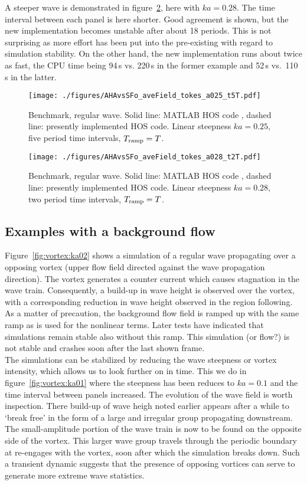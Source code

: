 \documentclass[a4paper,12pt]{article}
\renewcommand{\_}[1]{_\mr{#1}}
\begin{document}
A steeper wave is demonstrated in figure~\ref{fig:stokes_ka028}, here with $ka = 0.28$. The time interval between each panel is here shorter. Good agreement is shown, but the new implementation becomes unstable after about 18 periods. This is not surprising as more effort has been put into the pre-existing with regard to simulation stability. On the other hand, the new implementation runs about twice as fast, the CPU time being 94\,s vs. 220\,s in the former example and 52\,s vs.\ 110\,s in the latter.

\begin{figure}[h!ptb]%
\centering
\texttt{[image: ./figures/AHAvsSFo\_waveField\_Stokes\_ka025\_dt5T.pdf]}%
\caption{Benchmark, regular wave. Solid line: MATLAB HOS code \citep{SFo2018_HOS}, dashed line: presently implemented HOS code.
Linear steepness $ka = 0.25$, five period time intervals, $T\_{ramp}=T$.
}%
\label{fig:stokes_ka025}%
\end{figure}
\begin{figure}[h!ptb]%
\centering
\texttt{[image: ./figures/AHAvsSFo\_waveField\_Stokes\_ka028\_dt2T.pdf]}%
\caption{Benchmark, regular wave. Solid line: MATLAB HOS code \citep{SFo2018_HOS}, dashed line: presently implemented HOS code.
Linear steepness $ka = 0.28$, two period time intervals, $T\_{ramp}=T$.
}%
\label{fig:stokes_ka028}%
\end{figure}

\subsection{Examples with a background flow}
Figure~\ref{fig:vortex:ka02} shows a simulation of a regular wave propagating over a opposing vortex (upper flow field directed against the wave propagation direction). 
The vortex generates a counter current which causes stagnation in the wave train. 
Consequently, a build-up in wave height is observed over the vortex, with a corresponding reduction in wave height observed in the region following.
As a matter of precaution, the background flow field is ramped up with the same ramp as is used for the nonlinear terms. 
Later tests have indicated that simulations remain stable also without this ramp.
This simulation (or flow?) is not stable and crashes soon after the last shown frame.
\\

The simulations can be stabilized by reducing the wave steepness or vortex intensity, which allows us to look further on in time.
This we do in figure~\ref{fig:vortex:ka01} where the steepness has been reduces to $ka = 0.1$ and the time interval between panels increased.
The evolution of the wave field is worth inspection.
There build-up of wave heigh noted earlier appears after a while to `break free' in the form of a large and irregular group propagating downstream. 
The small-amplitude portion of the wave train is now to be found on the opposite side of the vortex.
This larger wave group travels through the periodic boundary at re-engages with the vortex, soon after which the simulation breaks down. 
Such a transient dynamic suggests that the presence of opposing vortices can serve to generate more extreme wave statistics.  
\\
\end{document}
